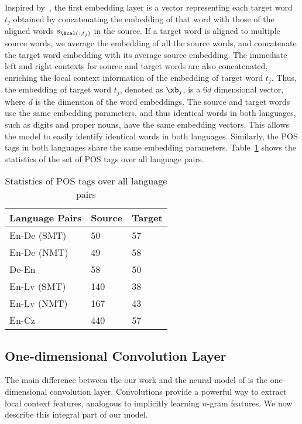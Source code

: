 \documentclass[11pt,a4paper]{article}
\begin{document}
Inspired by~\cite{TACL1113}, the first embedding layer is a vector representing each target word $t_j$ obtained by concatenating
the embedding of that word with those of the aligned words $s_{\Acal(:,t_j)}$ in the source. If a target word is aligned to multiple source words, we average the embedding of all the source words, and concatenate the target word embedding with its average source embedding. The immediate left and right contexts for source and target words are also concatenated,
enriching the local context information of the embedding of target word $t_j$.
Thus, the embedding of target word $t_j$, denoted as $\xb_j$, is a $6d$ dimensional vector,
where $d$ is the dimension of the word embeddings.
The source and target words use the same embedding parameters, and thus identical words in both languages, such as digits and proper nouns, have the same embedding vectors.
This allows the model to easily identify identical words in both languages. Similarly, the POS tags in both languages share the same embedding parameters. Table~\ref{tab:pos}
shows the statistics of the set of POS tags over all language pairs. 

\begin{table}[htp]
\setlength\tabcolsep{3pt} 
\centering
\begin{tabular}{lll} \hline
Language Pairs & Source & Target \\\hline
En-De (SMT) & 50 & 57   \\
En-De (NMT) & 49 & 58  \\
De-En & 58 & 50   \\
En-Lv (SMT) & 140 & 38   \\
En-Lv (NMT) & 167 & 43  \\
En-Cz & 440 & 57  \\\hline
\end{tabular}
\caption{Statistics of POS tags over all language pairs \label{tab:pos}}
\end{table}

\subsection{One-dimensional Convolution Layer}

The main difference between the our work and the neural model of \citet{TACL1113} is the
one-dimensional convolution layer.
Convolutions provide a powerful way to extract local context features, analogous to implicitly learning $n$-gram features. We now describe this integral part of our model.
\end{document}
